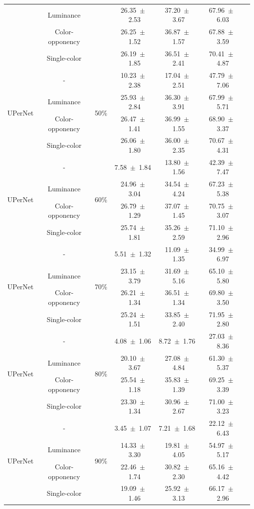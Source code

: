 \begin{table}[h]
\begin{tabular}{@{}lccc ccc@{}}
& Luminance & & 26.35~$\pm$~2.53 & 37.20~$\pm$~3.67 & 67.96~$\pm$~6.03 \\
& Color-opponency & & 26.25~$\pm$~1.52 & 36.87~$\pm$~1.57 & 67.88~$\pm$~3.59 \\
& Single-color & & 26.19~$\pm$~1.85 & 36.51~$\pm$~2.41 & 70.41~$\pm$~4.87 \\
\midrule
\multirow{4}{*}{UPerNet} & - & \multirow{4}{*}{50\%} & 10.23~$\pm$~2.38 & 17.04~$\pm$~2.51 & 47.79~$\pm$~7.06 \\
& Luminance & & 25.93~$\pm$~2.84 & 36.30~$\pm$~3.91 & 67.99~$\pm$~5.71 \\
& Color-opponency & & 26.47~$\pm$~1.41 & 36.99~$\pm$~1.55 & 68.90~$\pm$~3.37 \\
& Single-color & & 26.06~$\pm$~1.80 & 36.00~$\pm$~2.35 & 70.67~$\pm$~4.31 \\
\midrule
\multirow{4}{*}{UPerNet} & - & \multirow{4}{*}{60\%} & 7.58~$\pm$~1.84 & 13.80~$\pm$~1.56 & 42.39~$\pm$~7.47 \\
& Luminance & & 24.96~$\pm$~3.04 & 34.54~$\pm$~4.24 & 67.23~$\pm$~5.38 \\
& Color-opponency & & 26.79~$\pm$~1.29 & 37.07~$\pm$~1.45 & 70.75~$\pm$~3.07 \\
& Single-color & & 25.74~$\pm$~1.81 & 35.26~$\pm$~2.59 & 71.10~$\pm$~2.96 \\
\midrule
\multirow{4}{*}{UPerNet} & - & \multirow{4}{*}{70\%} & 5.51~$\pm$~1.32 & 11.09~$\pm$~1.35 & 34.99~$\pm$~6.97 \\
& Luminance & & 23.15~$\pm$~3.79 & 31.69~$\pm$~5.16 & 65.10~$\pm$~5.80 \\
& Color-opponency & & 26.21~$\pm$~1.34 & 36.51~$\pm$~1.34 & 69.80~$\pm$~3.50 \\
& Single-color & & 25.24~$\pm$~1.51 & 33.85~$\pm$~2.40 & 71.95~$\pm$~2.80 \\
\midrule
\multirow{4}{*}{UPerNet} & - & \multirow{4}{*}{80\%} & 4.08~$\pm$~1.06 & 8.72~$\pm$~1.76 & 27.03~$\pm$~8.36 \\
& Luminance & & 20.10~$\pm$~3.67 & 27.08~$\pm$~4.84 & 61.30~$\pm$~5.37 \\
& Color-opponency & & 25.54~$\pm$~1.18 & 35.83~$\pm$~1.39 & 69.25~$\pm$~3.39 \\
& Single-color & & 23.30~$\pm$~1.34 & 30.96~$\pm$~2.67 & 71.00~$\pm$~3.23 \\
\midrule
\multirow{4}{*}{UPerNet} & - & \multirow{4}{*}{90\%} & 3.45~$\pm$~1.07 & 7.21~$\pm$~1.68 & 22.12~$\pm$~6.43 \\
& Luminance & & 14.33~$\pm$~3.30 & 19.81~$\pm$~4.05 & 54.97~$\pm$~5.17 \\
& Color-opponency & & 22.46~$\pm$~1.74 & 30.82~$\pm$~2.30 & 65.16~$\pm$~4.42 \\
& Single-color & & 19.09~$\pm$~1.46 & 25.92~$\pm$~3.13 & 66.17~$\pm$~2.96 \\
\midrule
\bottomrule
\end{tabular}
\label{tab:sparse_results_upernet_acdc_snow}
\end{table}